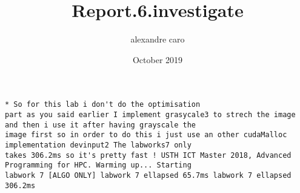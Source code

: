 \documentclass{article} \usepackage[utf8]{inputenc} \title{Report.6.investigate} \author{alexandre caro }
\date{October 2019}
\begin{document}
 \maketitle \begin{verbatim}* So for this lab i don't do the optimisation 
part as you said earlier I implement grasycale3 to strech the image and then i use it after having grayscale the 
image first so in order to do this i just use an other cudaMalloc implementation devinput2 The labworks7 only 
takes 306.2ms so it's pretty fast ! USTH ICT Master 2018, Advanced Programming for HPC. Warming up... Starting 
labwork 7 [ALGO ONLY] labwork 7 ellapsed 65.7ms labwork 7 ellapsed 306.2ms \end{verbatim} 
\end{document}
